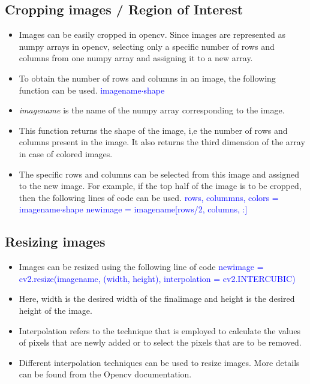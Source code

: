\documentclass[a4paper,12pt]{article}
\begin{document}
\subsection{Cropping images / Region of Interest}
\begin{itemize}
 \item Images can be easily cropped in opencv. Since images are represented as numpy arrays in opencv, selecting only a specific
 number of rows and columns from one numpy array and assigning it to a new array. 
 \item To obtain the number of rows and columns in an image, the following function can be used.
 \newline \textcolor{blue}{image\textunderscore name$\cdot$shape}
 \item \emph{image\textunderscore name} is the name of the numpy array corresponding to the image.
 \item This function returns the shape of the image, i,e the number of rows and columns present in the image. It also returns 
 the third dimension of the array in case of colored images.
 \item The specific rows and columns can be selected from this image and assigned to the new image. For example, if the top half
 of the image is to be cropped, then the following lines of code can be used.
 \newline \textcolor{blue}{rows, colummns, colors = image\textunderscore name$\cdot$shape}
 \newline \textcolor{blue}{new\textunderscore image = image\textunderscore name[rows/2, columns, :]}
\end{itemize}
 
\subsection{Resizing images}
\begin{itemize}
 \item Images can be resized using the following line of code
 \newline \textcolor{blue}{new\textunderscore image = cv2.resize(image\textunderscore name, (width, height), interpolation = cv2.INTER\textunderscore CUBIC)}
 \item Here, width is the desired width of the final\textunderscore image and height is the desired height of the image. 
 \item Interpolation refers to the technique that is employed to calculate the values of pixels that are newly added or 
  to select the pixels that are to be removed.
 \item Different interpolation techniques can be used to resize images. More details can be found from the Opencv documentation. 
 \end{itemize}
\end{document}
